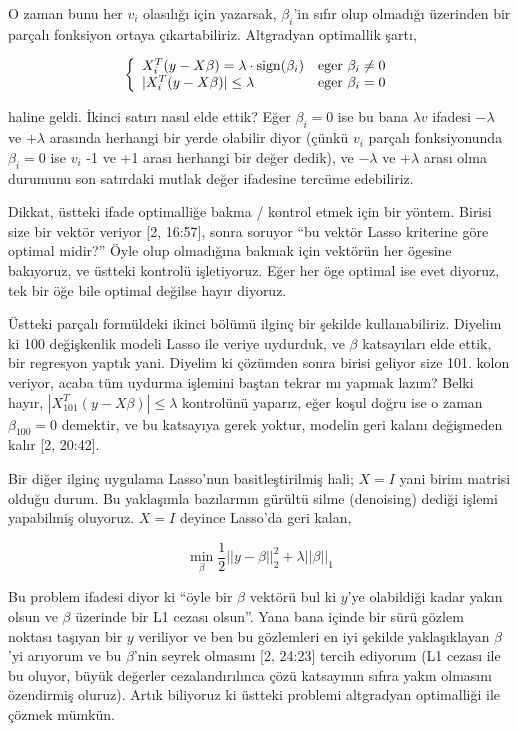 \documentclass[12pt,fleqn]{article}\usepackage{../../common}
\begin{document}
O zaman bunu her $v_i$ olasılığı için yazarsak, $\beta_i$'in sıfır olup
olmadığı üzerinden bir parçalı fonksiyon ortaya çıkartabiliriz. Altgradyan
optimallik şartı,

$$
\left\{ \begin{array}{ll}
X_i^T (y-X\beta) = \lambda \cdot \operatorname{sign}(\beta_i) & \textrm{eger } \beta_i \ne 0 \\
| X_i^T (y-X\beta)  | \le \lambda  & \textrm{eger } \beta_i = 0 
\end{array} \right.
$$

haline geldi. İkinci satırı nasıl elde ettik? Eğer $\beta_i=0$ ise bu bana
$\lambda v$ ifadesi $-\lambda$ ve $+\lambda$ arasında herhangi bir yerde
olabilir diyor (çünkü $v_i$ parçalı fonksiyonunda $\beta_i=0$ ise $v_i$ -1
ve +1 arası herhangi bir değer dedik), ve $-\lambda$ ve $+\lambda$ arası
olma durumunu son satırdaki mutlak değer ifadesine tercüme edebiliriz.

Dikkat, üstteki ifade optimalliğe bakma / kontrol etmek için bir
yöntem. Birisi size bir vektör veriyor [2, 16:57], sonra soruyor ``bu
vektör Lasso kriterine göre optimal midir?'' Öyle olup olmadığına bakmak
için vektörün her ögesine bakıyoruz, ve üstteki kontrolü işletiyoruz. Eğer
her öge optimal ise evet diyoruz, tek bir öğe bile optimal değilse hayır
diyoruz.

Üstteki parçalı formüldeki ikinci bölümü ilginç bir şekilde
kullanabiliriz. Diyelim ki 100 değişkenlik modeli Lasso ile veriye
uydurduk, ve $\beta$ katsayıları elde ettik, bir regresyon yaptık
yani. Diyelim ki çözümden sonra birisi geliyor size 101. kolon veriyor,
acaba tüm uydurma işlemini baştan tekrar mı yapmak lazım? Belki hayır, 
$| X_{101}^T (y-X\beta)  | \le \lambda$ kontrolünü yaparız, eğer koşul
doğru ise o zaman $\beta_{100} = 0$ demektir, ve bu katsayıya gerek
yoktur, modelin geri kalanı değişmeden kalır [2, 20:42]. 

Bir diğer ilginç uygulama Lasso'nun basitleştirilmiş hali; $X = I$ yani
birim matrisi olduğu durum. Bu yaklaşımla bazılarının gürültü silme
(denoising) dediği işlemi yapabilmiş oluyoruz. $X=I$ deyince Lasso'da geri
kalan, 

$$
\min_\beta \frac{1}{2} || y - \beta ||_2^2 + \lambda ||\beta||_1
$$

Bu problem ifadesi diyor ki ``öyle bir $\beta$ vektörü bul ki $y$'ye
olabildiği kadar yakın olsun ve $\beta$ üzerinde bir L1 cezası
olsun''. Yana bana içinde bir sürü gözlem noktası taşıyan bir $y$ veriliyor
ve ben bu gözlemleri en iyi şekilde yaklaşıklayan $\beta$'yi arıyorum ve bu
$\beta$'nin seyrek olmasını [2, 24:23] tercih ediyorum (L1 cezası ile bu
oluyor, büyük değerler cezalandırılınca çözü katsayının sıfıra yakın
olmasını özendirmiş oluruz). Artık biliyoruz ki üstteki problemi altgradyan
optimalliği ile çözmek mümkün.
\end{document}
